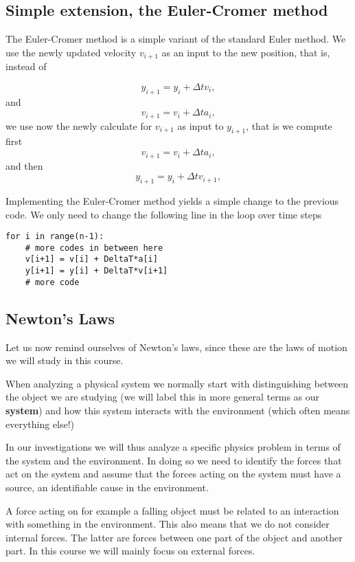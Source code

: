 \documentclass[%
oneside,                 %
final,                   %
10pt]{article}
\begin{document}
\subsection*{Simple extension, the Euler-Cromer method}

The Euler-Cromer method is a simple variant of the standard Euler
method. We use the newly updated velocity $v_{i+1}$ as an input to the
new position, that is, instead of

\[
y_{i+1} = y_i+\Delta t v_i,
\]
and
\[
v_{i+1} = v_i+\Delta t a_i,
\]
we use now the newly calculate for $v_{i+1}$ as input to $y_{i+1}$, that is 
we compute first 
\[
v_{i+1} = v_i+\Delta t a_i,
\]
and then
\[
y_{i+1} = y_i+\Delta t v_{i+1},
\]

Implementing the Euler-Cromer method yields a simple change to the previous code. We only need to change the following line in the loop over time
steps






\begin{verbatim}
for i in range(n-1):
    # more codes in between here
    v[i+1] = v[i] + DeltaT*a[i]
    y[i+1] = y[i] + DeltaT*v[i+1]
    # more code

\end{verbatim}


\subsection*{Newton's Laws}

Let us now remind ourselves of Newton's laws, since these are the laws of motion we will study in this course.

When analyzing a physical system we normally start with distinguishing between the object we are studying (we will label this in more general terms as our \textbf{system}) and how this system interacts with the environment (which often means everything else!)

In our investigations we will thus analyze a specific physics problem in terms of the system and the environment.
In doing so we need to identify the forces that act on the system and assume that the
forces acting on the system must have a source, an identifiable cause in
the environment.

A force acting on for example a falling object must be related to an interaction with something in the environment.
This also means that we do not consider internal forces. The latter are forces between
one part of the object and another part. In this course we will mainly focus on external forces.
\end{document}
